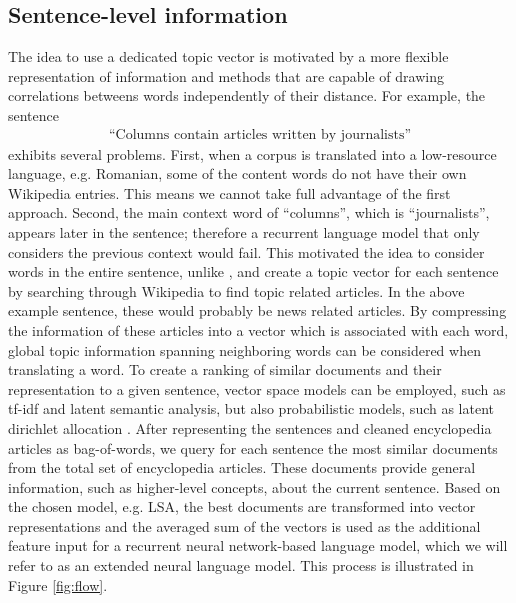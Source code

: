 \documentclass[a4paper]{article}
\begin{document}
\subsection{Sentence-level information} \label{sec:sentence-level}
The idea to use a dedicated topic vector is motivated by a more flexible representation of information and methods that are capable of drawing correlations betweens words independently of their distance.
For example, the sentence 
\begin{align}
\text{``Columns contain articles written by journalists''}
\end{align}
exhibits several problems. First, when a corpus is translated into a low-resource language, e.g. Romanian, some of the content words do not have their own Wikipedia entries. This means we cannot take full advantage of the first approach. Second, the main context word of ``columns'', which is ``journalists'', appears later in the sentence; therefore a recurrent language model that only considers the previous context would fail. 
This motivated the idea to consider words in the entire sentence, unlike \cite{mikolov2012context}, and create a topic vector for each sentence by searching through Wikipedia to find topic related articles. In the above example sentence, these would probably be news related articles. By compressing the information of these articles into a vector which is associated with each word, global topic information spanning neighboring words can be considered when translating a word. 
To create a ranking of similar documents and their representation to a given sentence, vector space models can be employed, such as tf-idf \cite{salton1986introduction} and latent semantic analysis\cite{bradford2008empirical}, but also probabilistic models, such as latent dirichlet allocation \cite{blei2003latent}. After representing the sentences and cleaned encyclopedia articles as bag-of-words, we query for each sentence the most similar documents from the total set of encyclopedia articles. These documents provide general information, such as higher-level concepts, about the current sentence. Based on the chosen model, e.g. LSA, the best documents are transformed into vector representations and the averaged sum of the vectors is used as the additional feature input for a recurrent neural network-based language model, which we will refer to as an extended neural language model. This process is illustrated in Figure \ref{fig:flow}.
\end{document}
